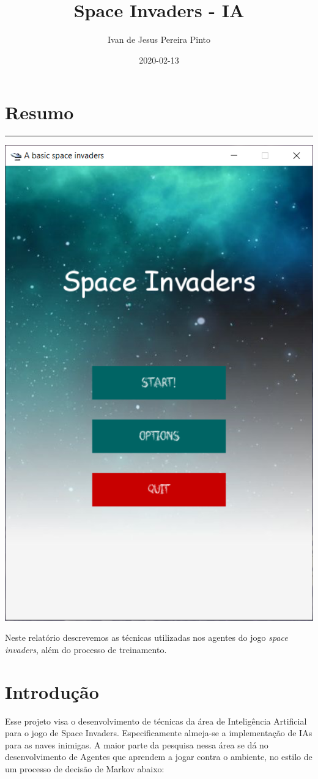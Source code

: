 \documentclass[]{book}
\title{Space Invaders - IA}
\author{Ivan de Jesus Pereira Pinto}
\date{2020-02-13}
\begin{document}
\maketitle

{
\setcounter{tocdepth}{1}
\tableofcontents
}
\chapter*{Resumo}\label{resumo}

\begin{center}\rule{0.5\linewidth}{0.5pt}\end{center}

\begin{center}\includegraphics[width=0.5\linewidth]{content/imgs/game} \end{center}

Neste relatório descrevemos as técnicas utilizadas nos agentes do jogo
\emph{space invaders}, além do processo de treinamento.

\chapter{Introdução}\label{intro}

Esse projeto visa o desenvolvimento de técnicas da área de Inteligência
Artificial para o jogo de Space Invaders. Especificamente almeja-se a
implementação de IAs para as naves inimigas. A maior parte da pesquisa
nessa área se dá no desenvolvimento de Agentes que aprendem a jogar
contra o ambiente, no estilo de um processo de decisão de Markov abaixo:
\end{document}

